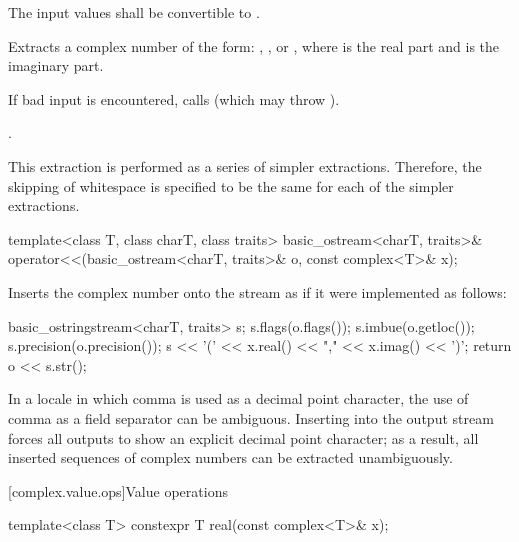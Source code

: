 \begin{itemdescr}
\pnum
\requires
The input values shall be convertible to
.

\pnum
\effects
Extracts a complex number  of the form:
,
,
or
,
where
is the real part and
is the imaginary part.

\pnum
If bad input is encountered, calls
(which may throw
).

\pnum
\returns
{}.

\pnum
\remarks
This extraction is performed as a series of simpler
extractions.
Therefore, the skipping of whitespace is specified to be
the same for each of the simpler extractions.
\end{itemdescr}

%
\begin{itemdecl}
template<class T, class charT, class traits>
  basic_ostream<charT, traits>& operator<<(basic_ostream<charT, traits>& o, const complex<T>& x);
\end{itemdecl}

\begin{itemdescr}
\pnum
\effects
Inserts the complex number 
onto the stream  as if it were implemented as follows:

\begin{codeblock}
basic_ostringstream<charT, traits> s;
s.flags(o.flags());
s.imbue(o.getloc());
s.precision(o.precision());
s << '(' << x.real() << "," << x.imag() << ')';
return o << s.str();
\end{codeblock}

\pnum
\begin{note}
In a locale in which comma is used as a decimal point character, the
use of comma as a field separator can be ambiguous. Inserting
 into the output stream forces all outputs to
show an explicit decimal point character; as a result, all inserted sequences of
complex numbers can be extracted unambiguously.
\end{note}
\end{itemdescr}

[complex.value.ops]{Value operations}

%
\begin{itemdecl}
template<class T> constexpr T real(const complex<T>& x);
\end{itemdecl}

